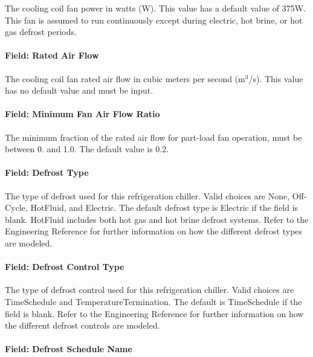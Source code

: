 The cooling coil fan power in watts (W). This value has a default value of 375W. This fan is assumed to run continuously except during electric, hot brine, or hot gas defrost periods.

\paragraph{Field: Rated Air Flow}\label{field-rated-air-flow}

The cooling coil fan rated air flow in cubic meters per second (m\(^{3}\)/s). This value has no default value and must be input.

\paragraph{Field: Minimum Fan Air Flow Ratio}\label{field-minimum-fan-air-flow-ratio-3}

The minimum fraction of the rated air flow for part-load fan operation, must be between 0. and 1.0. The default value is 0.2.

\paragraph{Field: Defrost Type}\label{field-defrost-type-1}

The type of defrost used for this refrigeration chiller. Valid choices are None, Off-Cycle, HotFluid, and Electric. The default defrost type is Electric if the field is blank. HotFluid includes both hot gas and hot brine defrost systems. Refer to the Engineering Reference for further information on how the different defrost types are modeled.

\paragraph{Field: Defrost Control Type}\label{field-defrost-control-type-1}

The type of defrost control used for this refrigeration chiller. Valid choices are TimeSchedule and TemperatureTermination. The default is TimeSchedule if the field is blank. Refer to the Engineering Reference for further information on how the different defrost controls are modeled.

\paragraph{Field: Defrost Schedule Name}\label{field-defrost-schedule-name-1}

